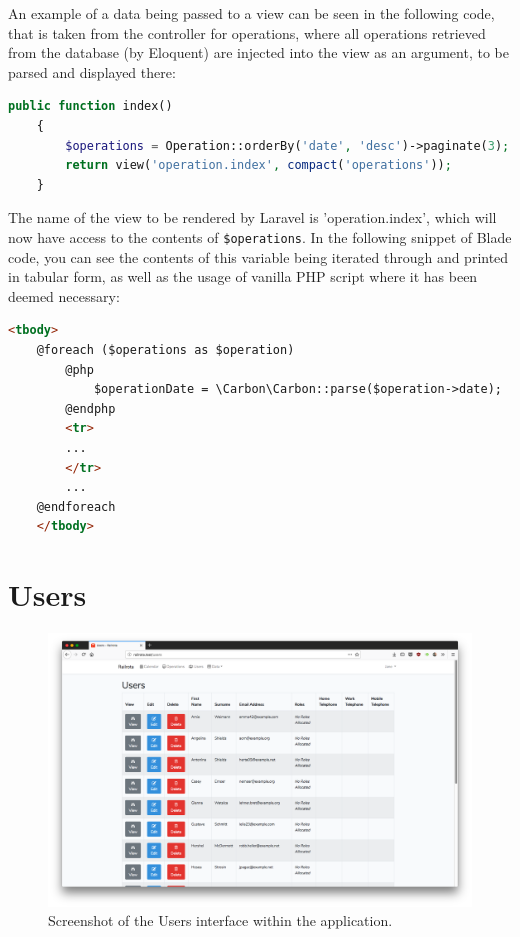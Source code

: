 An example of a data being passed to a view can be seen in the following code, that is taken from the controller for operations, where all operations retrieved from the database (by Eloquent) are injected into the view as an argument, to be parsed and displayed there:

\begin{lstlisting}[language=PHP, breaklines]
    public function index()
    {
        $operations = Operation::orderBy('date', 'desc')->paginate(3);
        return view('operation.index', compact('operations'));
    }
\end{lstlisting}

The name of the view to be rendered by Laravel is 'operation.index', which will now have access to the contents of \texttt{\$operations}. In the following snippet of Blade code, you can see the contents of this variable being iterated through and printed in tabular form, as well as the usage of vanilla PHP script where it has been deemed necessary:

\begin{lstlisting}[language=HTML, breaklines]
    <tbody>
    @foreach ($operations as $operation)
        @php
            $operationDate = \Carbon\Carbon::parse($operation->date);
        @endphp
        <tr>
        ...
        </tr>
        ...
    @endforeach
    </tbody>
\end{lstlisting}

\section{Users}

\begin{figure}[!ht]
    \centering
    \includegraphics[width=1.0\textwidth]{Figures/screenshot-users}
    \caption{Screenshot of the Users interface within the application.}
    \label{fig:users}
\end{figure}

